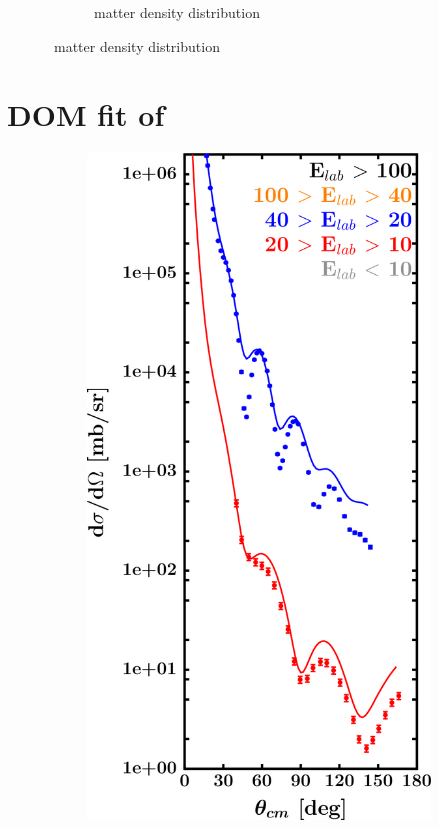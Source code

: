\begin{figure}[hbtp]
\begin{subfigure}{0.70\textwidth}
        \caption{\niFour\ matter density distribution}
        \label{DOMFitData_ni64_matterDensity}
    \end{subfigure}
\end{figure}

\newpage
\section{DOM fit of \snTwelve}
\label{sn112DOMOutput}
\begin{figure}[hbtp]
    \captionsetup[subfigure]{labelformat=empty}
    \centering
    \begin{subfigure}[c]{0.39\textheight}
        \centering
        \includegraphics[width=\linewidth]{figures/sn112_protonElastic.png}

\end{subfigure}
\end{figure}
